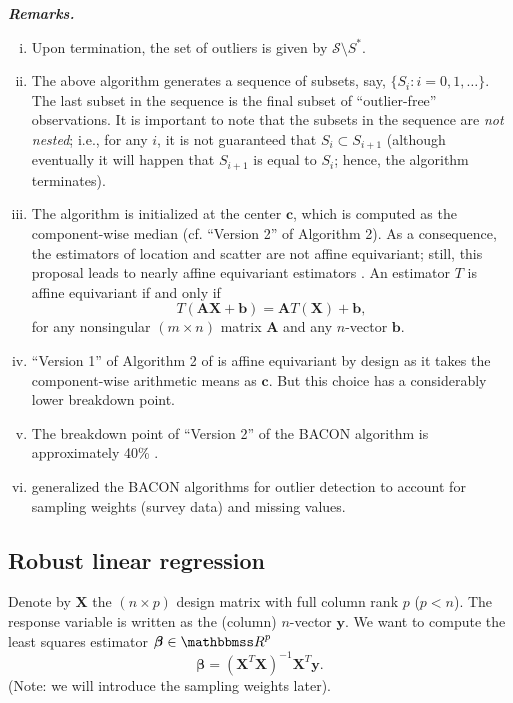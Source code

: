 \documentclass[a4paper,oneside,11pt,DIV=12]{scrartcl}
\newcommand{\R}{{\mathbbmss R}}
\begin{document}
\vspace{1em}
\noindent\textbf{\sffamily \small \itshape Remarks.}
\vspace{-0.5em}
\begin{enumerate}[i)]
	\item Upon termination, the set of outliers is given by
		$\mathscr{S} \setminus S^*$.
	\item The above algorithm generates a sequence of subsets, say,
		$\{S_i : i=0,1, \ldots\}$. The last subset in the sequence is
		the final subset of ``outlier-free'' observations. It is important
		to note that the subsets in the sequence are \textit{not  nested};
		i.e., for any $i$, it is not guaranteed that $S_i \subset S_{i+1}$
		(although eventually it will happen that $S_{i+1}$ is equal to
		$S_i$; hence, the algorithm terminates).
	\item The algorithm is initialized at the center $\bm c$, which is
		computed as the component-wise median (cf. ``Version 2'' of
		Algorithm 2). As a consequence, the estimators of location and
		scatter are not affine equivariant; still, this proposal leads
		to nearly affine equivariant estimators \citep{billor_hadi_etal_2000}.
		An estimator $T$ is affine equivariant if and only if
		\begin{equation*}
			T(\bm A \bm X + \bm b) = \bm A T(\bm X) + \bm b,
		\end{equation*}
		\noindent for any nonsingular $(m \times n)$ matrix $\bm A$ and
		any $n$-vector $\bm b$.
	\item ``Version 1'' of Algorithm 2 of \citet{billor_hadi_etal_2000} is
		affine equivariant by design as it takes the component-wise
		arithmetic means as $\bm c$. But this choice has a considerably
		lower breakdown point.
	\item The breakdown point of ``Version 2'' of the BACON algorithm is
		approximately 40\% \citep{billor_hadi_etal_2000}.
	\item \citet{beguin_hulliger_2008} generalized the BACON algorithms
		for outlier detection to account for sampling weights (survey data)
		and missing values.
\end{enumerate}

\subsection{Robust linear regression}
Denote by $\bm X$ the $(n \times p)$ design matrix with full column
rank $p$ ($p < n$). The response variable is written as the (column)
$n$-vector $\bm y$. We want to compute the least squares estimator
$\bm \beta \in \R^p$
\begin{equation*}
	\bm \beta = (\bm X^T \bm X)^{-1} \bm X^T \bm y.
\end{equation*}
\noindent (Note: we will introduce the sampling weights later).
\end{document}
